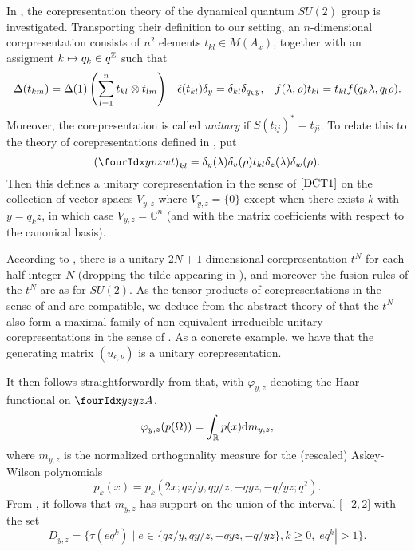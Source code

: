 In \cite{KoR1}, the corepresentation theory of the dynamical quantum $SU(2)$ group is investigated. Transporting their definition to our setting, an $n$-dimensional corepresentation consists of $n^2$ elements $t_{kl} \in M(A_x)$, together with an assigment $k \mapsto q_k \in q^{\mathbb{Z}}$ such that \begin{align*} \Delta(t_{km}) = \Delta(1)\left(\sum_{l=1}^n t_{kl}\otimes t_{lm}\right)&& \operatorname{\tilde{\epsilon}}(t_{kl})\delta_y = \delta_{kl} \delta_{q_ky},&& f(\lambda,\rho)t_{kl} = t_{kl}f(q_k\lambda,q_l\rho).\end{align*} Moreover, the corepresentation is called \emph{unitary} if $S(t_{ij})^* =t_{ji}$. To relate this to the theory of corepresentations defined in \cite{DCT1}, put \[\left(\Gr{t}{y}{z}{v}{w}\right)_{kl} = \delta_{y}(\lambda)\delta_v(\rho) t_{kl} \delta_{z}(\lambda)\delta_{w}(\rho).\] Then this defines a unitary corepresentation in the sense of $\cite{DCT1}$ on the collection of vector spaces $V_{y,z}$ where $V_{y,z}=\{0\}$ except when there exists $k$ with $y = q_kz$,  in which case $V_{y,z} = \mathbb{C}^n$ (and with the matrix coefficients with respect to the canonical basis). 

According to \cite{KoR1}, there is a unitary $2N+1$-dimensional corepresentation $t^N$ for each half-integer $N$ (dropping the tilde appearing in \cite{KoR1}), and moreover the fusion rules of the $t^N$ are as for $SU(2)$. As the tensor products of corepresentations in the sense of \cite{KoR1} and \cite{DCT1} are compatible, we deduce from the abstract theory of \cite{DCT1} that the $t^N$ also form a maximal family of non-equivalent irreducible unitary corepresentations in the sense of \cite{DCT1}. %
As a concrete example, we have that the generating matrix $(u_{\epsilon,\nu})$ is a unitary corepresentation.


It then follows straightforwardly from \cite[Section 7]{KoR1} that, with $\varphi_{y,z}$ denoting the Haar functional on $\Gr{A}{y}{y}{z}{z}$, \[\varphi_{y,z}(p(\Omega)) = \int_{\mathbb{R}} p(x)\mathrm{d} m_{y,z},\] where $m_{y,z}$ is the normalized orthogonality measure for the (rescaled) Askey-Wilson polynomials \[p_k(x) = p_k(2x;qz/y,qy/z,-qyz,-q/yz;q^2).\] From \cite[Theorem 2.1 and Theorem 2.5]{AsW1}%
, it follows that $m_{y,z}$ has support on the union of the interval $\lbrack -2,2\rbrack$ with the set \[D_{y,z} = \{\tau(eq^k)\mid e\in \{qz/y,qy/z,-qyz,-q/yz\}, k\geq 0, |eq^k|>1\}.\]

